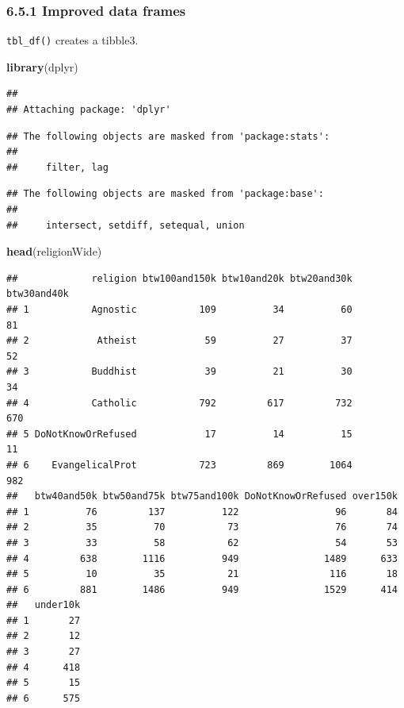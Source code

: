 \documentclass[]{article}
\newenvironment{Shaded}{\begin{snugshade}}{\end{snugshade}}
\newcommand{\KeywordTok}[1]{\textcolor[rgb]{0.13,0.29,0.53}{\textbf{#1}}}
\newcommand{\NormalTok}[1]{#1}
\begin{document}
\subsubsection{6.5.1 Improved data frames}\label{improved-data-frames}

\texttt{tbl\_df()} creates a tibble3.

\begin{Shaded}
\begin{Highlighting}[]
\KeywordTok{library}\NormalTok{(dplyr)}
\end{Highlighting}
\end{Shaded}

\begin{verbatim}
## 
## Attaching package: 'dplyr'
\end{verbatim}

\begin{verbatim}
## The following objects are masked from 'package:stats':
## 
##     filter, lag
\end{verbatim}

\begin{verbatim}
## The following objects are masked from 'package:base':
## 
##     intersect, setdiff, setequal, union
\end{verbatim}

\begin{Shaded}
\begin{Highlighting}[]
\KeywordTok{head}\NormalTok{(religionWide)}
\end{Highlighting}
\end{Shaded}

\begin{verbatim}
##             religion btw100and150k btw10and20k btw20and30k btw30and40k
## 1           Agnostic           109          34          60          81
## 2            Atheist            59          27          37          52
## 3           Buddhist            39          21          30          34
## 4           Catholic           792         617         732         670
## 5 DoNotKnowOrRefused            17          14          15          11
## 6    EvangelicalProt           723         869        1064         982
##   btw40and50k btw50and75k btw75and100k DoNotKnowOrRefused over150k
## 1          76         137          122                 96       84
## 2          35          70           73                 76       74
## 3          33          58           62                 54       53
## 4         638        1116          949               1489      633
## 5          10          35           21                116       18
## 6         881        1486          949               1529      414
##   under10k
## 1       27
## 2       12
## 3       27
## 4      418
## 5       15
## 6      575
\end{verbatim}
\end{document}
